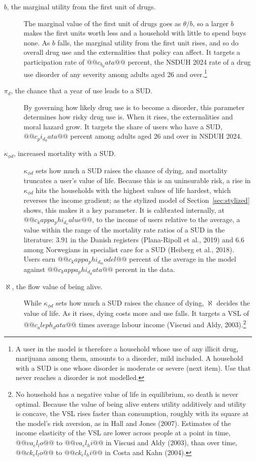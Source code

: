 \documentclass[10pt]{article}
\begin{document}
\begin{description}
\item[$b$, the marginal utility from the first unit of drugs.] The marginal value of the first unit of drugs goes as $\theta/b$, so a larger $b$ makes the first units worth less and a household with little to spend buys none. As $b$ falls, the marginal utility from the first unit rises, and so do overall drug use and the externalities that policy can affect. It targets a participation rate of $@@c_b_data@@$ percent, the NSDUH 2024 rate of a drug use disorder of any severity among adults aged 26 and over.\footnote{A user in the model is therefore a household whose use of any illicit drug, marijuana among them, amounts to a disorder, mild included. A household with a SUD is one whose disorder is moderate or severe (next item). Use that never reaches a disorder is not modelled.}
\item[$\pi_d$, the chance that a year of use leads to a SUD.]   By governing how likely drug use is to become a disorder, this parameter determines how risky drug use is. When it rises, the externalities and moral hazard grow. It targets the share of users who have a SUD, $@@c_pi_d_data@@$ percent among adults aged 26 and over in NSDUH 2024.
\item[$\kappa_{\phi d}$, increased mortality with a SUD.] $\kappa_{\phi d}$ sets how much a SUD raises the chance of dying, and mortality truncates a user's value of life. Because this is an uninsurable risk, a rise in $\kappa_{\phi d}$ hits the households with the highest values of life hardest, which reverses the income gradient; as the stylized model of Section~\ref{sec:stylized} shows, this makes it a key parameter. It is calibrated internally, at $@@c_kappa_phi_d_value@@$, to the income of users relative to the average, a value within the range of the mortality rate ratios of a SUD in the literature: $3.91$ in the Danish registers (Plana-Ripoll et al., 2019) and $6.6$ among Norwegians in specialist care for a SUD (Heiberg et al., 2018). Users earn $@@c_kappa_phi_d_model@@$ percent of the average in the model against $@@c_kappa_phi_d_data@@$ percent in the data.
\item[$\aleph$, the flow value of being alive.]   While $\kappa_{\phi d}$ sets how much a SUD raises the chance of dying, $\aleph$ decides the value of life. As it rises, dying costs more and use falls. It targets a VSL of $@@c_aleph_data@@$ times average labour income (Viscusi and Aldy, 2003).\footnote{No household has a negative value of life in equilibrium, so death is never optimal. Because the value of being alive enters utility additively and utility is concave, the VSL rises faster than consumption, roughly with its square at the model's risk aversion, as in Hall and Jones (2007). Estimates of the income elasticity of the VSL are lower across people at a point in time, $@@va_el_lo@@$ to $@@va_el_hi@@$ in Viscusi and Aldy (2003), than over time, $@@ck_el_lo@@$ to $@@ck_el_hi@@$ in Costa and Kahn (2004).}
\end{description}
\end{document}
